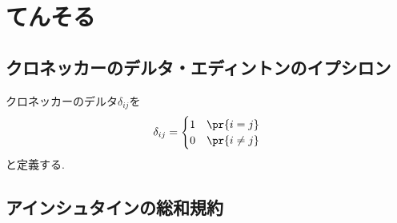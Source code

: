\chapter{てんそる}
	\section{クロネッカーのデルタ・エディントンのイプシロン}
		クロネッカーのデルタ$\delta_{ij}$を
		\begin{equation}
			\delta_{ij} = \begin{cases} 1 & \pr{i = j} \\ 0 & \pr{i \neq j} \end{cases}
		\end{equation}
		と定義する.
	\section{アインシュタインの総和規約}
	